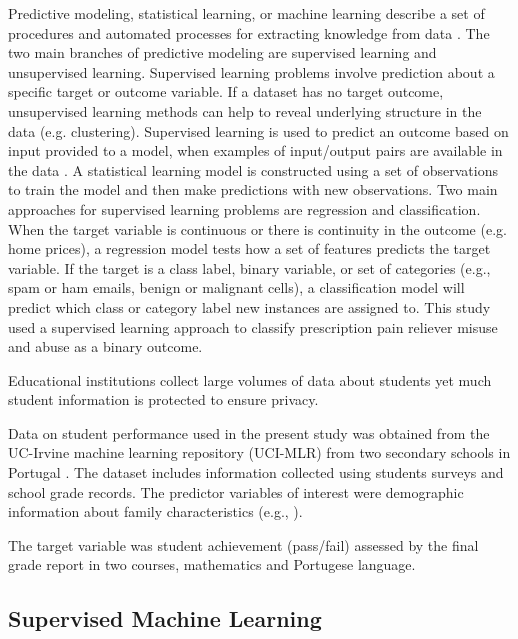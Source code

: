 \documentclass[sigconf]{acmart}
\begin{document}
Predictive modeling, statistical learning, or machine learning describe a 
set of procedures and automated processes for extracting knowledge from 
data \cite{james13, kuhn13, muller17, raschka17}. The two main branches 
of predictive modeling are supervised learning and unsupervised learning. 
Supervised learning problems involve prediction about a specific target 
or outcome variable. If a dataset has no target outcome, unsupervised 
learning methods can help to reveal underlying structure in the data 
(e.g. clustering). Supervised learning is used to predict an outcome based 
on input provided to a model, when examples of input/output pairs are 
available in the data \cite{muller17}. A statistical learning model is 
constructed using a set of observations to train the model and then make
predictions with new observations. Two main approaches for supervised learning 
problems are regression and classification. When the target variable
is continuous or there is continuity in the outcome (e.g. home prices), a 
regression model tests how a set of features predicts the target variable. 
If the target is a class label, binary variable, or set of categories 
(e.g., spam or ham emails, benign or malignant cells), a classification model 
will predict which class or category label new instances are assigned to. 
This study used a supervised learning approach to classify prescription pain
reliever misuse and abuse as a binary outcome. 


Educational institutions collect large volumes of data about students yet 
much student information is protected to ensure privacy. 

Data on student performance used in the present study was obtained from the
UC-Irvine machine learning repository (UCI-MLR) from two secondary schools 
in Portugal \cite{cortez09}. The dataset includes information collected using
students surveys and school grade records. The predictor variables of interest
were demographic information about family characteristics (e.g., ).

The target variable was student achievement (pass/fail) assessed by the 
final grade report in two courses, mathematics and Portugese language. 



\subsection{Supervised Machine Learning} 
\end{document}

